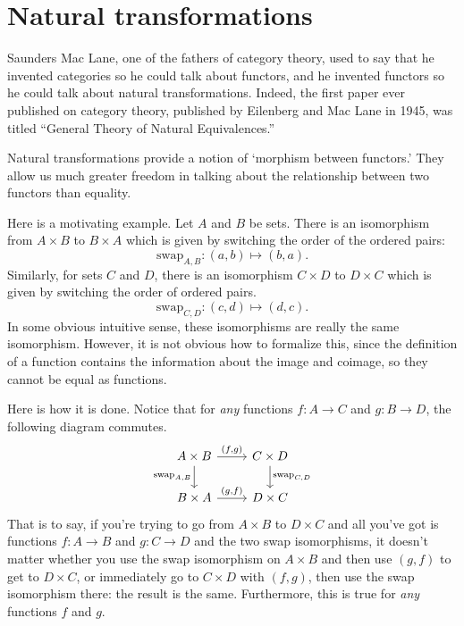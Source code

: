 \documentclass[a4paper]{report}
\theoremstyle{definition}
\theoremstyle{plain}
\theoremstyle{remark}
\begin{document}
\section{Natural transformations} \label{sec:naturaltransformations}
Saunders Mac Lane, one of the fathers of category theory, used to say that he invented categories so he could talk about functors, and he invented functors so he could talk about natural transformations. Indeed, the first paper ever published on category theory, published by Eilenberg and Mac Lane in 1945, was titled ``General Theory of Natural Equivalences.'' \cite{awodey-intro-to-categories}

Natural transformations provide a notion of `morphism between functors.' They allow us much greater freedom in talking about the relationship between two functors than equality.

Here is a motivating example. Let $A$ and $B$ be sets. There is an isomorphism from $A \times B$ to $B \times A$ which is given by switching the order of the ordered pairs:
\begin{equation*}
  \mathrm{swap}_{A, B}\colon (a, b) \mapsto (b, a).
\end{equation*}
Similarly, for sets $C$ and $D$, there is an isomorphism $C \times D$ to $D \times C$ which is given by switching the order of ordered pairs.
\begin{equation*}
  \mathrm{swap}_{C, D}\colon (c, d) \mapsto (d, c).
\end{equation*}
In some obvious intuitive sense, these isomorphisms are really the same isomorphism. However, it is not obvious how to formalize this, since the definition of a function contains the information about the image and coimage, so they cannot be equal as functions. 

Here is how it is done. Notice that for \emph{any} functions $f\colon A \to C$ and $g\colon B \to D$, the following diagram commutes.
\begin{equation*}
  \begin{tikzcd}
    A \times B
    \arrow[r, "{(f, g)}"]
    \arrow[d, swap, "{\text{swap}_{A, B}}"]
    & C \times D
    \arrow[d, "{\text{swap}_{C, D}}"]
    \\
    B \times A
    \arrow[r, "{(g, f)}"]
    & D \times C
  \end{tikzcd}
\end{equation*}
That is to say, if you're trying to go from $A \times B$ to $D \times C$ and all you've got is functions $f\colon A \to B$ and $g\colon C \to D$ and the two swap isomorphisms, it doesn't matter whether you use the swap isomorphism on $A \times B$ and then use $(g, f)$ to get to $D \times C$, or immediately go to $C \times D$ with $(f, g)$, then use the swap isomorphism there: the result is the same. Furthermore, this is true for \emph{any} functions $f$ and $g$.
\end{document}
